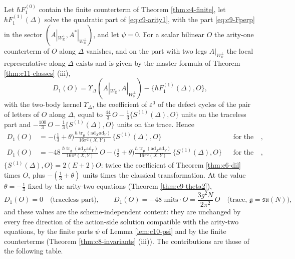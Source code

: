 \begin{theorem}
\label{thm:c9-D1}
Let $\hbar F_1^{(0)}$ contain the finite counterterm of Theorem \ref{thm:c4-finite}, let $\hbar F_1^{(1)}(\Delta)$ solve the quadratic part of \eqref{eq:c9-arity1}, with the part \eqref{eq:c9-Fperp} in the sector $(A|_{W_{\mathbb R}^\perp},A^*|_{W_{\mathbb R}^\perp})$, and let $\psi=0$. For a scalar bilinear $O$ the arity-one counterterm of $O$ along $\Delta$ vanishes, and on the part with two legs $A|_{W_{\mathbb R}^\perp}$ the local representative along $\Delta$ exists and is given by the master formula of Theorem \ref{thm:c11-classes} (iii),
\[
D_1(O)=\Upsilon_\Delta(A|_{W_{\mathbb R}^\perp},A|_{W_{\mathbb R}^\perp})-\big\{\hbar F_1^{(1)}(\Delta),O\big\},
\]
with the two-body kernel $\Upsilon_\Delta$, the coefficient of $\varepsilon^0$ of the defect cycles of the pair of letters of $O$ along $\Delta$, equal to $\tfrac{44}3\,O-\tfrac13\{S^{(1)}(\Delta),O\}$ units on the traceless part and $-\tfrac{100}3\,O-\tfrac13\{S^{(1)}(\Delta),O\}$ units on the trace. Hence
\begin{equation}
\begin{aligned}
D_1(O)&=-\big(\tfrac13+\theta\big)\frac{\hbar\operatorname{tr}_{\mathfrak g}(\mathrm{ad}_X\mathrm{ad}_Y)}{16\pi^2(X,Y)}\,\{S^{(1)}(\Delta),O\}&&\text{for the traceless part},\\
D_1(O)&=-48\,\frac{\hbar\operatorname{tr}_{\mathfrak g}(\mathrm{ad}_X\mathrm{ad}_Y)}{16\pi^2(X,Y)}\,O-\big(\tfrac13+\theta\big)\frac{\hbar\operatorname{tr}_{\mathfrak g}(\mathrm{ad}_X\mathrm{ad}_Y)}{16\pi^2(X,Y)}\,\{S^{(1)}(\Delta),O\}&&\text{for the trace},
\end{aligned}
\label{eq:c9-D1}
\end{equation}
$\{S^{(1)}(\Delta),O\}=2(E+2)O$: twice the coefficient of Theorem \ref{thm:c6-dil} times $O$, plus $-(\tfrac13+\theta)$ units times the classical transformation. At the value $\theta=-\tfrac13$ fixed by the arity-two equations (Theorem \ref{thm:c9-theta2}),
\[
D_1(O)=0\quad\text{(traceless part)},\qquad D_1(O)=-48\,\text{units}\cdot O=\frac{3g^2N}{2\pi^2}\,O\quad\text{(trace, }\mathfrak g=\mathfrak{su}(N)\text{)},
\]
and these values are the scheme-independent content: they are unchanged by every free direction of the action-side solution compatible with the arity-two equations, by the finite parts $\psi$ of Lemma \ref{lem:c10-psi} and by the finite counterterms (Theorem \ref{thm:c8-invariants} (iii)). The contributions are those of the following table.
\end{theorem}

